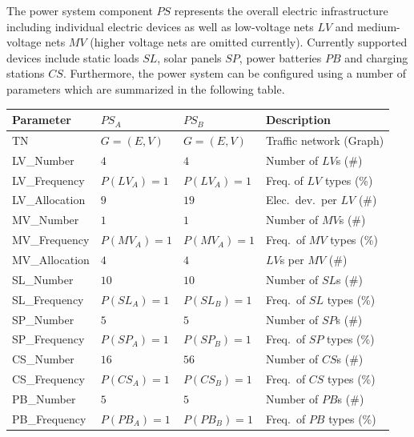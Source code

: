 The power system component $PS$ represents the overall electric infrastructure including individual electric devices as well as low-voltage nets $LV$ and medium-voltage nets $MV$ (higher voltage nets are omitted currently). Currently supported devices include static loads $SL$, solar panels $SP$, power batteries $PB$ and charging stations $CS$. Furthermore, the power system can be configured using a number of parameters which are summarized in the following table.

\begin{table}[h]
	\renewcommand{\arraystretch}{1.3}
	\centering
	\begin{tabularx}{\columnwidth}{lllX}
		\hline
		\textbf{Parameter}     & \textbf{$PS_{A}$} & \textbf{$PS_{B}$}       & \textbf{Description} \\ \hline
		TN              	   & $G=(E,V)$ & $G=(E,V)$    	  & Traffic network (Graph)     \\
		LV\_Number             & $4$ & $4$            & Number of $LV$s (\#)      \\
		LV\_Frequency          & $P(LV_{A})=1$ & $P(LV_{A})=1$                & Freq. of $LV$ types (\%)      \\
		LV\_Allocation         & $9$ & $19$                 & Elec.\ dev.\ per $LV$ (\#)      \\   
		MV\_Number             & $1$ & $1$        & Number of $MV$s (\#)      \\ 
		MV\_Frequency          & $P(MV_{A})=1$ & $P(MV_{A})=1$                & Freq.\ of $MV$ types (\%)      \\
		MV\_Allocation         & $4$ & $4$                     & $LV$s per $MV$ (\#)      \\   
		SL\_Number             & $10$ & $10$              & Number of $SL$s (\#)      \\
		SL\_Frequency          & $P(SL_{A})=1$ & $P(SL_{B})=1$              & Freq.\ of $SL$ types (\%)       \\
		SP\_Number             & $5$ & $5$         & Number of $SP$s (\#)      \\ 
		SP\_Frequency          & $P(SP_{A})=1$ & $P(SP_{B})=1$                & Freq.\ of $SP$ types (\%)       \\  
		CS\_Number             & $16$  & $56$           & Number of $CS$s (\#)      \\
		CS\_Frequency          & $P(CS_{A})=1$  & $P(CS_{B})=1$               & Freq.\ of $CS$ types (\%)       \\   
		PB\_Number             & $5$  & $5$              & Number of $PB$s (\#)      \\
		PB\_Frequency          & $P(PB_{A})=1$ & $P(PB_{B})=1$              & Freq.\ of $PB$ types (\%)       \\   \hline  
	\end{tabularx}
\end{table}

